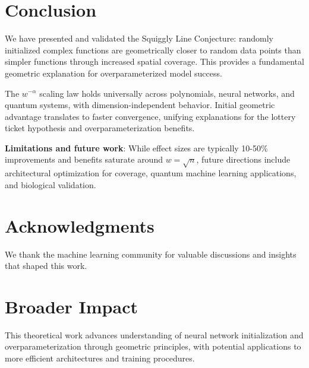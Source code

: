 \section{Conclusion}
\label{sec:conclusion}

We have presented and validated the Squiggly Line Conjecture: randomly initialized complex functions are geometrically closer to random data points than simpler functions through increased spatial coverage. This provides a fundamental geometric explanation for overparameterized model success.

The $w^{-\alpha}$ scaling law holds universally across polynomials, neural networks, and quantum systems, with dimension-independent behavior. Initial geometric advantage translates to faster convergence, unifying explanations for the lottery ticket hypothesis and overparameterization benefits.

\textbf{Limitations and future work}: While effect sizes are typically 10-50\% improvements and benefits saturate around $w = \sqrt{n}$, future directions include architectural optimization for coverage, quantum machine learning applications, and biological validation.

\section*{Acknowledgments}

We thank the machine learning community for valuable discussions and insights that shaped this work.

\section*{Broader Impact}

This theoretical work advances understanding of neural network initialization and overparameterization through geometric principles, with potential applications to more efficient architectures and training procedures.
